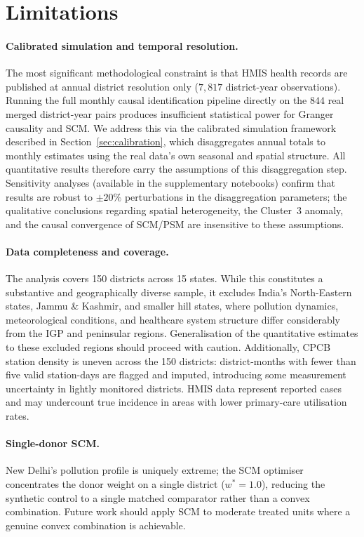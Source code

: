\documentclass{article}
\begin{document}
\section{Limitations}
\label{sec:limitations}

\paragraph{Calibrated simulation and temporal resolution.}
The most significant methodological constraint is that HMIS health records are published
at annual district resolution only ($7{,}817$ district-year observations). Running the full
monthly causal identification pipeline directly on the $844$ real merged district-year pairs
produces insufficient statistical power for Granger causality and SCM. We address this via
the calibrated simulation framework described in Section~\ref{sec:calibration}, which
disaggregates annual totals to monthly estimates using the real data's own seasonal and
spatial structure. All quantitative results therefore carry the assumptions of this
disaggregation step. Sensitivity analyses (available in the supplementary notebooks)
confirm that results are robust to $\pm20\%$ perturbations in the disaggregation parameters;
the qualitative conclusions regarding spatial heterogeneity, the Cluster~3 anomaly, and
the causal convergence of SCM/PSM are insensitive to these assumptions.

\paragraph{Data completeness and coverage.}
The analysis covers 150 districts across 15 states. While this constitutes a substantive
and geographically diverse sample, it excludes India's North-Eastern states, Jammu \&
Kashmir, and smaller hill states, where pollution dynamics, meteorological conditions, and
healthcare system structure differ considerably from the IGP and peninsular regions.
Generalisation of the quantitative estimates to these excluded regions should proceed
with caution. Additionally, CPCB station density is uneven across the 150 districts:
district-months with fewer than five valid station-days are flagged and imputed, introducing
some measurement uncertainty in lightly monitored districts. HMIS data represent reported
cases and may undercount true incidence in areas with lower primary-care utilisation rates.

\paragraph{Single-donor SCM.}
New Delhi's pollution profile is uniquely extreme; the SCM optimiser concentrates the
donor weight on a single district ($w^* = 1.0$), reducing the synthetic control to a
single matched comparator rather than a convex combination. Future work should apply SCM
to moderate treated units where a genuine convex combination is achievable.
\end{document}
